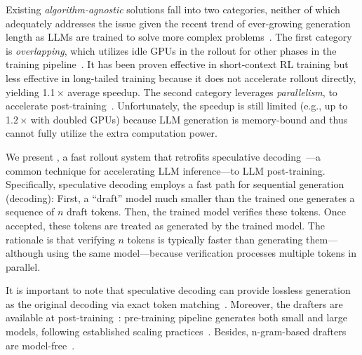 Existing \emph{algorithm-agnostic} solutions fall into two categories,
neither of which adequately addresses the issue 
given the recent trend of ever-growing generation length as
LLMs are trained to solve more complex problems~\cite{swebench,agentbench,deepseek-r1}.
The first category is \emph{overlapping}, which utilizes idle GPUs in the rollout for other
phases in the training pipeline~\cite{rlhfuse}.
It has been proven effective in short-context RL training but 
less effective in long-tailed training 
because it does not accelerate rollout directly, yielding 
1.1\,$\times$ average speedup.
The second category leverages \emph{parallelism},
 to accelerate post-training~\cite{rlboost}.
Unfortunately,
the speedup is still limited (e.g., up to 1.2\,$\times$ with doubled GPUs)
because LLM generation is memory-bound and thus cannot fully utilize the extra computation power. 

We present {\sys}, a fast rollout system that retrofits speculative decoding~\cite{DBLP:conf/osdi/BehrensCSBKZ20,DBLP:conf/osdi/ChangG99,spec-action,spec-edge}---a
common technique for accelerating LLM inference---to LLM post-training. 
Specifically, speculative decoding employs a fast path for sequential generation (decoding):
First, a ``draft'' model much smaller than the trained one 
generates a sequence of $n$ draft tokens.
Then, the trained model verifies these tokens. 
Once accepted, these tokens are treated as generated by the trained model.
The rationale is that
verifying $n$ tokens is {typically faster than generating them}---although 
using the same model---because
{verification processes multiple tokens in parallel.}

It is important to note that speculative decoding can provide lossless generation 
as the original decoding via exact token matching~\cite{DBLP:conf/acl/XiaYDW00L0S24}.
Moreover, the drafters are available at post-training~\cite{spd,specinfer}:
pre-training pipeline generates both small and large models,
following established scaling practices~\cite{qwen2.5,qwen3}.
Besides, n-gram-based drafters are model-free~\cite{pld,DBLP:conf/acl/HuWZZLCZ25}. 



